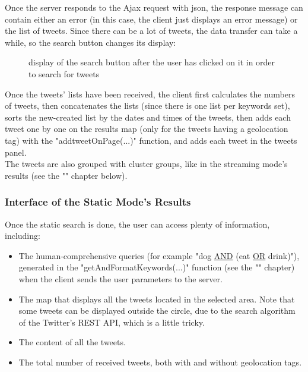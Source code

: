 \documentclass[a4paper,11pt]{report}
\begin{document}
Once the server responds to the Ajax request with json, the response message can contain either an error (in this case, the client just displays an error message) or the list of tweets. Since there can be a lot of tweets, the data transfer can take a while, so the search button changes its display:
\begin{figure}[H]
\vspace{-5pt}
\begin{center}
\vspace{-20pt}
\caption{display of the search button after the user has clicked on it
in order to search for tweets}
\end{center}
\end{figure}
\vspace{-10pt}

Once the tweets' lists have been received, the client first calculates the numbers of tweets, then concatenates the lists (since there is one list per keywords set), sorts the new-created list by the dates and times of the tweets, then adds each tweet one by one on the results map (only for the tweets having a geolocation tag) with the "addtweetOnPage(...)" function, and adds each tweet in the tweets panel.\\

The tweets are also grouped with cluster groups, like in the streaming mode's results (see the "" chapter below).
\bigskip

\subsubsection{Interface of the Static Mode's Results}
Once the static search is done, the user can access plenty of information, including:
\begin{itemize}
	\item The human-comprehensive queries (for example "dog \underline{AND} (eat \underline{OR} drink)"), generated in the "getAndFormatKeywords(...)" function (see the "" chapter) when the client sends the user parameters to the server.
	\item The map that displays all the tweets located in the selected area. Note that some tweets can be displayed outside the circle, due to the search algorithm of the Twitter's REST API, which is a little tricky.
	\item The content of all the tweets.
	\item The total number of received tweets, both with and without geolocation tags.
\end{itemize}
\newpage
\end{document}

